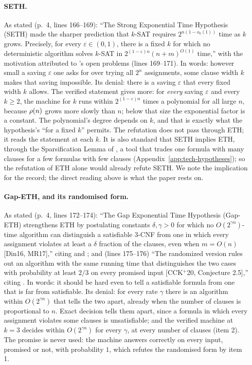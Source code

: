 \paragraph{SETH.}
As stated (p.~4, lines 166--169): ``The Strong Exponential Time
Hypothesis (SETH) made the sharper prediction that $k$-SAT requires
$2^{n(1-o_k(1))}$ time as $k$ grows. Precisely, for every
$\varepsilon \in (0,1)$, there is a fixed $k$ for which no deterministic
algorithm solves $k$-SAT in $2^{(1-\varepsilon)n}(n+m)^{O(1)}$ time,''
with the motivation attributed to \citet{ImpagliazzoPaturi2001}'s open
problems (lines 169--171). In words: however small a saving
$\varepsilon$ one asks for over trying all $2^n$ assignments, some clause
width $k$ makes that saving impossible. Its denial: there is a saving
$\varepsilon$ that every fixed width $k$ allows. The verified statement
gives more: for \emph{every} saving $\varepsilon$ and every $k \ge 2$,
the machine for $k$ runs within $2^{(1-\varepsilon)n}$ times a
polynomial for all large $n$, because $\rho(n)$ grows more slowly than
$n$; below that size the exponential factor is a constant. The
polynomial's degree depends on $k$, and that is exactly what the
hypothesis's ``for a fixed $k$'' permits. The refutation does not pass
through ETH; it reads the statement at each $k$. It is also standard
that SETH implies ETH, through the Sparsification Lemma of \citet{ImpagliazzoPaturiZane2001}, a tool that trades one formula with many clauses for a few formulas with few clauses (Appendix~\ref{app:tech-hypotheses});
so the refutation of ETH alone would already refute SETH. We note the
implication for the record; the direct reading above is what the paper
rests on.

\paragraph{Gap-ETH, and its randomised form.}
As stated (p.~4, lines 172--174): ``The Gap Exponential Time Hypothesis
(Gap-ETH) strengthens ETH by postulating constants $\delta, \gamma > 0$
for which no $O(2^{\gamma n})$-time algorithm can distinguish a
satisfiable 3-CNF from one in which every assignment violates at least a
$\delta$ fraction of the clauses, even when $m = O(n)$ [Din16, MR17],''
citing \citet{Dinur2016} and \citet{ManurangsiRaghavendra2017}; and
(lines 175--176) ``The randomized version rules out an algorithm with
the same running time that distinguishes the two cases with probability
at least $2/3$ on every promised input [CCK$^+$20, Conjecture 2.5],''
citing \citet{Chalermsook2020}. In words: it should be hard even to tell
a satisfiable formula from one that is far from satisfiable. Its
denial: for every rate $\gamma$ there is an algorithm within
$O(2^{\gamma n})$ that tells the two apart, already when the number of
clauses is proportional to $n$. Exact decision tells them apart, since a
formula in which every assignment violates some clauses is
unsatisfiable; and the verified machine at $k = 3$ decides within
$O(2^{\gamma n})$ for every $\gamma$, at every number of clauses (item
2). The promise is never used: the machine answers correctly on every
input, promised or not, with probability $1$, which refutes the
randomised form by item 1.

